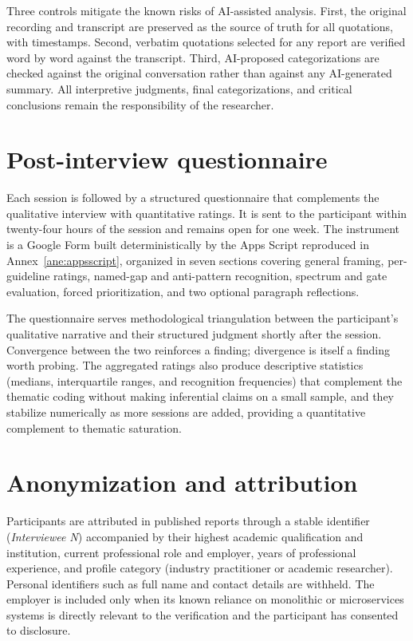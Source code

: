 Three controls mitigate the known risks of AI-assisted analysis. First, the original recording and transcript are preserved as the source of truth for all quotations, with timestamps. Second, verbatim quotations selected for any report are verified word by word against the transcript. Third, AI-proposed categorizations are checked against the original conversation rather than against any AI-generated summary. All interpretive judgments, final categorizations, and critical conclusions remain the responsibility of the researcher.

\section*{Post-interview questionnaire}

Each session is followed by a structured questionnaire that complements the qualitative interview with quantitative ratings. It is sent to the participant within twenty-four hours of the session and remains open for one week. The instrument is a Google Form built deterministically by the Apps Script reproduced in Annex~\ref{ane:appsscript}, organized in seven sections covering general framing, per-guideline ratings, named-gap and anti-pattern recognition, spectrum and gate evaluation, forced prioritization, and two optional paragraph reflections.

The questionnaire serves methodological triangulation between the participant's qualitative narrative and their structured judgment shortly after the session. Convergence between the two reinforces a finding; divergence is itself a finding worth probing. The aggregated ratings also produce descriptive statistics (medians, interquartile ranges, and recognition frequencies) that complement the thematic coding without making inferential claims on a small sample, and they stabilize numerically as more sessions are added, providing a quantitative complement to thematic saturation.

\section*{Anonymization and attribution}

Participants are attributed in published reports through a stable identifier (\emph{Interviewee N}) accompanied by their highest academic qualification and institution, current professional role and employer, years of professional experience, and profile category (industry practitioner or academic researcher). Personal identifiers such as full name and contact details are withheld. The employer is included only when its known reliance on monolithic or microservices systems is directly relevant to the verification and the participant has consented to disclosure.

